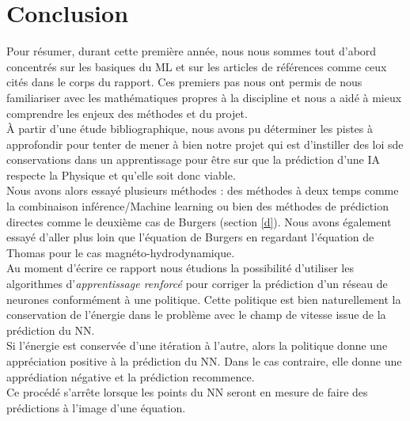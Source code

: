 \documentclass[a4paper,12pt]{article}
\newcommand\bk{\color{black}}
\newcommand\navy{\color{navy}}
\numberwithin{equation}{section} %
\begin{document}
\pagebreak

\navy \section{Conclusion} \bk
\noindent Pour résumer, durant cette première année, nous nous sommes tout d'abord concentrés sur les basiques du ML et sur les articles de références comme ceux cités dans le corps du rapport. Ces premiers pas nous ont permis de nous familiariser avec les mathématiques propres à la discipline et nous a aidé à mieux comprendre les enjeux des méthodes et du projet.\\
À partir d'une étude bibliographique, nous avons pu déterminer les pistes à approfondir pour tenter de mener à bien notre projet qui est d'instiller des loi sde conservations dans un apprentissage pour être sur que la prédiction d'une IA respecte la Physique et qu'elle soit donc viable.\\
Nous avons alors essayé plusieurs méthodes : des méthodes à deux temps comme la combinaison inférence/Machine learning ou bien des méthodes de prédiction directes comme le deuxième cas de Burgers (section \eqref{d}). Nous avons également essayé d'aller plus loin que l'équation de Burgers en regardant l'équation de Thomas pour le cas magnéto-hydrodynamique.\\
	
\noindent Au moment d'écrire ce rapport nous étudions la possibilité d'utiliser les algorithmes d'\textit{apprentissage renforcé} pour corriger la prédiction d'un réseau de neurones conformément à une politique. Cette politique est bien naturellement la conservation de l'énergie dans le problème avec le champ de vitesse issue de la prédiction du NN. \\
Si l'énergie est conservée d'une itération à l'autre, alors la politique donne une appréciation positive à la prédiction du NN. Dans le cas contraire, elle donne une apprédiation négative et la prédiction recommence.\\
Ce procédé s'arrête lorsque les points du NN seront en mesure de faire des prédictions à l'image d'une équation.\\




\pagebreak



\end{document}

